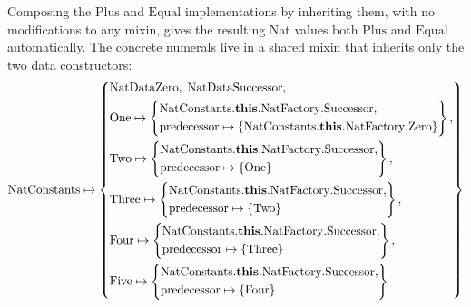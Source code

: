 Composing the $\mathrm{Plus}$ and $\mathrm{Equal}$ implementations by
inheriting them, with no modifications to any mixin, gives the
resulting Nat values both $\mathrm{Plus}$ and $\mathrm{Equal}$
automatically.
The concrete numerals live in a shared mixin that inherits only the
two data constructors:
\[
  \mathrm{NatConstants} \mapsto \left\{
    \begin{aligned}
      &\mathrm{NatDataZero},\; \mathrm{NatDataSuccessor},\\
      &\mathrm{One} \mapsto \left\{
        \begin{aligned}
          &\mathrm{NatConstants}.\mathbf{this}.\mathrm{NatFactory}.\mathrm{Successor},\\
          &\mathrm{predecessor} \mapsto \{\mathrm{NatConstants}.\mathbf{this}.\mathrm{NatFactory}.\mathrm{Zero}\}
      \end{aligned}\right\},\\
      &\mathrm{Two} \mapsto \left\{
        \begin{aligned}
          &\mathrm{NatConstants}.\mathbf{this}.\mathrm{NatFactory}.\mathrm{Successor},\\
          &\mathrm{predecessor} \mapsto \{\mathrm{One}\}
      \end{aligned}\right\},\\
      &\mathrm{Three} \mapsto \left\{
        \begin{aligned}
          &\mathrm{NatConstants}.\mathbf{this}.\mathrm{NatFactory}.\mathrm{Successor},\\
          &\mathrm{predecessor} \mapsto \{\mathrm{Two}\}
      \end{aligned}\right\},\\
      &\mathrm{Four} \mapsto \left\{
        \begin{aligned}
          &\mathrm{NatConstants}.\mathbf{this}.\mathrm{NatFactory}.\mathrm{Successor},\\
          &\mathrm{predecessor} \mapsto \{\mathrm{Three}\}
      \end{aligned}\right\},\\
      &\mathrm{Five} \mapsto \left\{
        \begin{aligned}
          &\mathrm{NatConstants}.\mathbf{this}.\mathrm{NatFactory}.\mathrm{Successor},\\
          &\mathrm{predecessor} \mapsto \{\mathrm{Four}\}
      \end{aligned}\right\}
  \end{aligned}\right\}
\]
